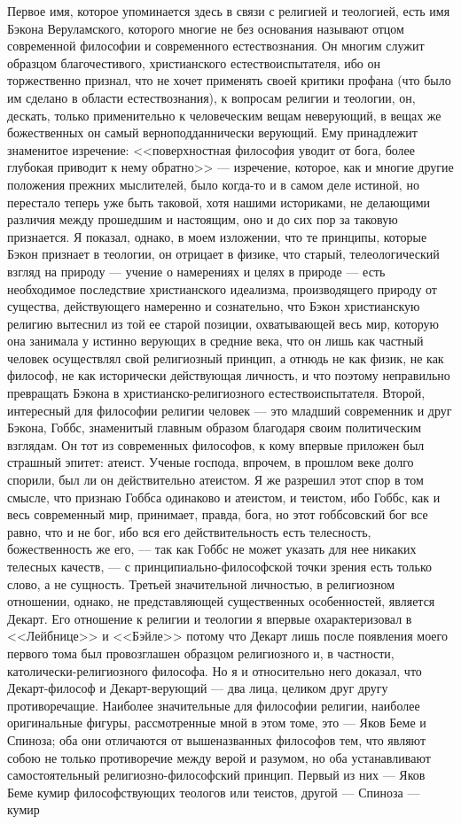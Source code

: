 \documentclass[12pt]{article}
\begin{document}
Первое имя, которое упоминается здесь в связи с религией и теологией, есть имя Бэкона Веруламского, которого многие не без основания называют отцом современной философии и современного естествознания. Он многим служит образцом благочестивого, христианского естествоиспытателя, ибо он торжественно признал, что не хочет применять своей критики профана (что было им сделано в области естествознания), к вопросам религии и теологии, он, дескать, только применительно к человеческим вещам неверующий, в вещах же божественных он самый верноподданнически верующий. Ему принадлежит знаменитое изречение: <<поверхностная философия уводит от бога, более глубокая приводит к нему обратно>>  --- изречение, которое, как и многие другие положения прежних мыслителей, было когда-то и в самом деле истиной, но перестало теперь уже быть таковой, хотя нашими историками, не делающими различия между прошедшим и настоящим, оно и до сих пор за таковую признается. Я показал, однако, в моем изложении, что те принципы, которые Бэкон признает в теологии, он отрицает в физике, что старый, телеологический взгляд на природу --- учение о намерениях и целях в природе --- есть необходимое последствие христианского идеализма, производящего природу от существа, действующего намеренно и сознательно, что Бэкон христианскую религию вытеснил из той ее старой позиции, охватывающей весь мир, которую она занимала у истинно верующих в средние века, что он лишь как частный человек осуществлял свой религиозный принцип, а отнюдь не как физик, не как философ, не как исторически действующая личность, и что поэтому неправильно превращать Бэкона в христианско-религиозного естествоиспытателя. Второй, интересный для философии религии человек --- это младший современник и друг Бэкона, Гоббс, знаменитый главным образом благодаря своим политическим взглядам. Он тот из современных философов, к кому впервые приложен был страшный эпитет: атеист. Ученые господа, впрочем, в прошлом веке долго спорили, был ли он действительно атеистом. Я же разрешил этот спор в том смысле, что признаю Гоббса одинаково и атеистом, и теистом, ибо Гоббс, как и весь современный мир, принимает, правда, бога, но этот гоббсовский бог все равно, что и не бог, ибо вся его действительность есть телесность, божественность же его, --- так как Гоббс не может указать для нее никаких телесных качеств, --- с принципиально-философской точки зрения есть только слово, а не сущность. Третьей значительной личностью, в религиозном отношении, однако, не представляющей существенных особенностей, является Декарт. Его отношение к религии и теологии я впервые охарактеризовал в <<Лейбнице>> и <<Бэйле>>  потому что Декарт лишь после появления моего первого тома был провозглашен образцом религиозного и, в частности, католически-религиозного философа. Но я и относительно него доказал, что Декарт-философ и Декарт-верующий --- два лица, целиком друг другу противоречащие. Наиболее значительные для философии религии, наиболее оригинальные фигуры, рассмотренные мной в этом томе, это --- Яков Беме и Спиноза; оба они отличаются от вышеназванных философов тем, что являют собою не только противоречие между верой и разумом, но оба устанавливают самостоятельный религиозно-философский принцип. Первый из них --- Яков Беме кумир философствующих теологов или теистов, другой --- Спиноза --- кумир 
\end{document}
